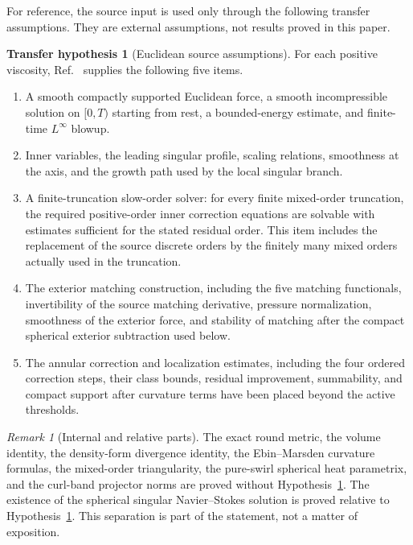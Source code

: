 \documentclass[aps,prd,reprint,superscriptaddress,nofootinbib,floatfix]{revtex4-2}
\theoremstyle{definition}
\newtheorem{hypothesis}[theorem]{Transfer hypothesis}
\theoremstyle{remark}
\newtheorem{remark}[theorem]{Remark}
\begin{document}
For reference, the source input is used only through the following transfer
assumptions.  They are external assumptions, not results proved in this paper.

\begin{hypothesis}[Euclidean source assumptions]\label{hyp:source}
	For each positive viscosity, Ref.~\cite{OpenAI2026Paper} supplies the following
	five items.
	\begin{enumerate}[label=\(\mathbf{S_{\arabic*}}\),leftmargin=*,start=0]
		\item\label{hyp:S0} A smooth compactly supported Euclidean force, a smooth
		      incompressible solution on \([0,T)\) starting from rest, a bounded-energy
		      estimate, and finite-time \(L^\infty\) blowup.
		\item\label{hyp:S1} Inner variables, the leading singular profile, scaling
		      relations, smoothness at the axis, and the growth path used by the local
		      singular branch.
		\item\label{hyp:S2} A finite-truncation slow-order solver: for every finite
		      mixed-order truncation, the required positive-order inner correction equations
		      are solvable with estimates sufficient for the stated residual order. This item
		      includes the replacement of the source discrete orders by the finitely many
		      mixed orders actually used in the truncation.
		\item\label{hyp:S3} The exterior matching construction, including the five
		      matching functionals, invertibility of the source matching derivative, pressure
		      normalization, smoothness of the exterior force, and stability of matching after
		      the compact spherical exterior subtraction used below.
		\item\label{hyp:S4} The annular correction and localization estimates, including
		      the four ordered correction steps, their class bounds, residual improvement,
		      summability, and compact support after curvature terms have been placed beyond
		      the active thresholds.
	\end{enumerate}
\end{hypothesis}

\begin{remark}[Internal and relative parts]\label{rem:internalrelative}
	The exact round metric, the volume identity, the density-form divergence identity, the Ebin--Marsden curvature formulas, the mixed-order triangularity, the pure-swirl spherical heat parametrix, and the curl-band projector norms are proved without Hypothesis~\ref{hyp:source}.  The existence of the spherical singular Navier--Stokes solution is proved relative to Hypothesis~\ref{hyp:source}.  This separation is part of the statement, not a matter of exposition.
\end{remark}
\end{document}
